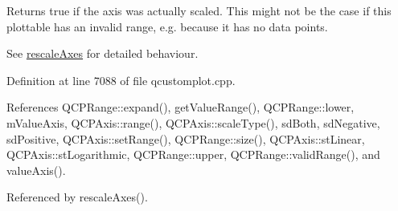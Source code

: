 Returns true if the axis was actually scaled. This might not be the case if this plottable has an invalid range, e.\+g. because it has no data points.

See \hyperlink{class_q_c_p_abstract_plottable_a7e8fc3be43c27ccacd70a7bf9d74a5cd}{rescale\+Axes} for detailed behaviour. 

Definition at line 7088 of file qcustomplot.\+cpp.



References Q\+C\+P\+Range\+::expand(), get\+Value\+Range(), Q\+C\+P\+Range\+::lower, m\+Value\+Axis, Q\+C\+P\+Axis\+::range(), Q\+C\+P\+Axis\+::scale\+Type(), sd\+Both, sd\+Negative, sd\+Positive, Q\+C\+P\+Axis\+::set\+Range(), Q\+C\+P\+Range\+::size(), Q\+C\+P\+Axis\+::st\+Linear, Q\+C\+P\+Axis\+::st\+Logarithmic, Q\+C\+P\+Range\+::upper, Q\+C\+P\+Range\+::valid\+Range(), and value\+Axis().



Referenced by rescale\+Axes().


